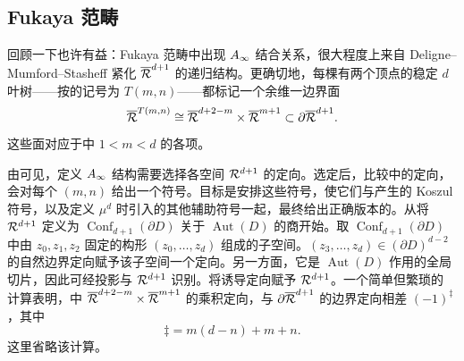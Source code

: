 \subsection{Fukaya 范畴}\label{sec:12g}
回顾一下也许有益：Fukaya 范畴中出现 $A_\infty$ 结合关系，很大程度上来自 Deligne–Mumford–Stasheff 紧化 $\overline{\mathcal R}^{d+1}$ 的递归结构。更确切地，每棵有两个顶点的稳定 $d$ 叶树——按的记号为 $T(m,\allowbreak n)$——都标记一个余维一边界面
\begin{equation}\label{eq:12.21}
\overline{\mathcal R}^{T(m,n)}\cong\overline{\mathcal R}^{d+2-m}\times\overline{\mathcal R}^{m+1}\subset\partial\overline{\mathcal R}^{d+1}.
\end{equation}
这些面对应于中 $1<m<d$ 的各项。

由可见，定义 $A_\infty$ 结构需要选择各空间 $\mathcal R^{d+1}$ 的定向。选定后，比较中的定向，会对每个 $(m,\allowbreak n)$ 给出一个符号。目标是安排这些符号，使它们与产生的 Koszul 符号，以及定义 $\mu^d$ 时引入的其他辅助符号一起，最终给出正确版本的。从将 $\mathcal R^{d+1}$ 定义为 $\operatorname{Conf}_{d+1}(\partial D)$ 关于 $\operatorname{Aut}(D)$ 的商开始。取 $\operatorname{Conf}_{d+1}(\partial D)$ 中由 $z_0,\allowbreak z_1,\allowbreak z_2$ 固定的构形 $(z_0,\allowbreak \ldots,\allowbreak z_d)$ 组成的子空间。$(z_3,\allowbreak \ldots,\allowbreak z_d)\in(\partial D)^{d-2}$ 的自然边界定向赋予该子空间一个定向。另一方面，它是 $\operatorname{Aut}(D)$ 作用的全局切片，因此可经投影与 $\mathcal R^{d+1}$ 识别。将诱导定向赋予 $\mathcal R^{d+1}$。一个简单但繁琐的
计算表明，中 $\overline{\mathcal R}^{d+2-m}\times\overline{\mathcal R}^{m+1}$ 的乘积定向，与 $\partial\overline{\mathcal R}^{d+1}$ 的边界定向相差 $(-1)^\ddagger$，其中
\begin{equation}\label{eq:12.22}
\ddagger=m(d-n)+m+n.
\end{equation}
这里省略该计算。

